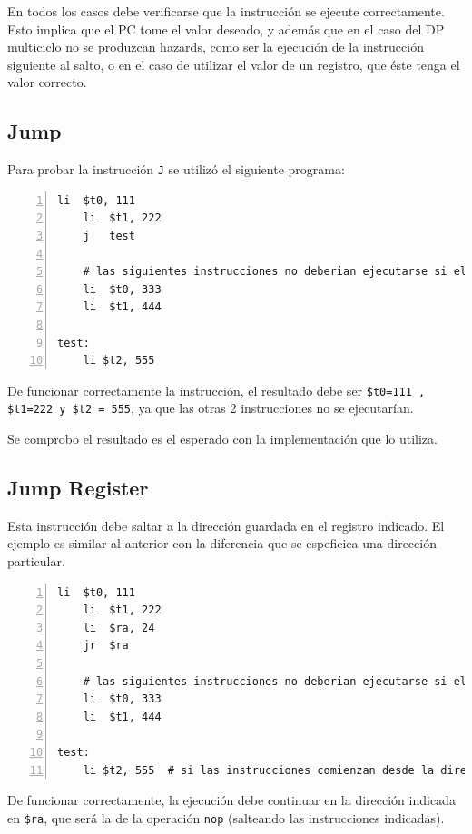 \documentclass[11pt,a4paper, spanish]{article}
\begin{document}
En todos los casos debe verificarse que la instrucción se ejecute correctamente. Esto implica
que el PC tome el valor deseado, y además que en el caso del DP multiciclo no se produzcan
hazards, como ser la ejecución de la instrucción siguiente al salto, o en el caso de utilizar el valor
de un registro, que éste tenga el valor correcto.


\subsection{Jump}

Para probar la instrucción \texttt{J} se utilizó el siguiente programa:

\begin{lstlisting}[numbers=left, tabsize=2, basicstyle=\fontsize{11}{13}\ttfamily, frame=single, caption={Test j}]
	li	$t0, 111
	li	$t1, 222
	j	test

	# las siguientes instrucciones no deberian ejecutarse si el salto se realiza
	li	$t0, 333
	li	$t1, 444

test:
	li $t2, 555
\end{lstlisting}

De funcionar correctamente la instrucción, el resultado debe ser \texttt{\$t0=111 , \$t1=222 y \$t2 = 555}, ya que las otras 2 instrucciones no se ejecutarían.

Se comprobo el resultado es el esperado con la implementación que lo utiliza.

\subsection{Jump Register}

Esta instrucción debe saltar a la dirección guardada en el registro indicado. El ejemplo es similar al
anterior con la diferencia que se espeficica una dirección particular.

\begin{lstlisting}[numbers=left, tabsize=2, basicstyle=\fontsize{11}{13}\ttfamily, frame=single, caption={Test jr}]
	li	$t0, 111
	li	$t1, 222
	li	$ra, 24
	jr	$ra

	# las siguientes instrucciones no deberian ejecutarse si el salto se realiza
	li	$t0, 333
	li	$t1, 444

test:
	li $t2, 555  # si las instrucciones comienzan desde la dirección 0, esta tiene la dirección 24
\end{lstlisting}

De funcionar correctamente, la ejecución debe continuar en la dirección indicada en \texttt{\$ra}, que
será la de la operación \texttt{nop} (salteando las instrucciones indicadas).
\end{document}
